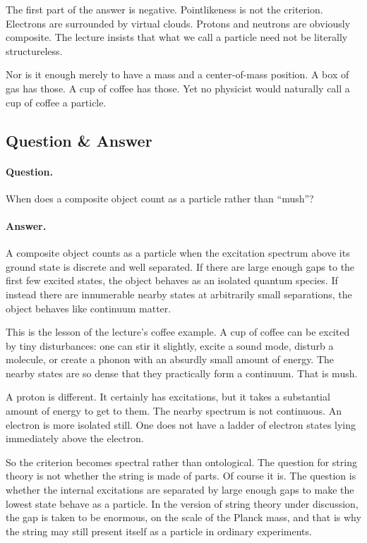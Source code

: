The first part of the answer is negative. Pointlikeness is not the criterion. Electrons are surrounded by virtual clouds. Protons and neutrons are obviously composite. The lecture insists that what we call a particle need not be literally structureless.

Nor is it enough merely to have a mass and a center-of-mass position. A box of gas has those. A cup of coffee has those. Yet no physicist would naturally call a cup of coffee a particle.

\subsection{Question \& Answer}

\paragraph{Question.}
When does a composite object count as a particle rather than ``mush''?

\paragraph{Answer.}
A composite object counts as a particle when the excitation spectrum above its ground state is discrete and well separated. If there are large enough gaps to the first few excited states, the object behaves as an isolated quantum species. If instead there are innumerable nearby states at arbitrarily small separations, the object behaves like continuum matter.

This is the lesson of the lecture's coffee example. A cup of coffee can be excited by tiny disturbances: one can stir it slightly, excite a sound mode, disturb a molecule, or create a phonon with an absurdly small amount of energy. The nearby states are so dense that they practically form a continuum. That is mush.

A proton is different. It certainly has excitations, but it takes a substantial amount of energy to get to them. The nearby spectrum is not continuous. An electron is more isolated still. One does not have a ladder of electron states lying immediately above the electron.

So the criterion becomes spectral rather than ontological. The question for string theory is not whether the string is made of parts. Of course it is. The question is whether the internal excitations are separated by large enough gaps to make the lowest state behave as a particle. In the version of string theory under discussion, the gap is taken to be enormous, on the scale of the Planck mass, and that is why the string may still present itself as a particle in ordinary experiments.

